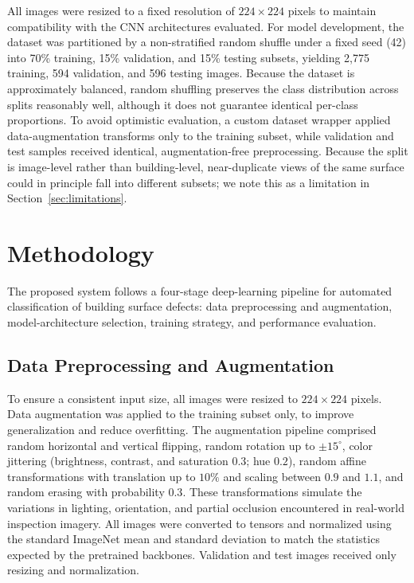 \documentclass[ASNA, twocolumn]{USG}
\begin{document}
All images were resized to a fixed resolution of $224\times224$ pixels to maintain compatibility with the CNN architectures evaluated. For model development, the dataset was partitioned by a non-stratified random shuffle under a fixed seed (42) into 70\% training, 15\% validation, and 15\% testing subsets, yielding 2{,}775 training, 594 validation, and 596 testing images. Because the dataset is approximately balanced, random shuffling preserves the class distribution across splits reasonably well, although it does not guarantee identical per-class proportions. To avoid optimistic evaluation, a custom dataset wrapper applied data-augmentation transforms only to the training subset, while validation and test samples received identical, augmentation-free preprocessing. Because the split is image-level rather than building-level, near-duplicate views of the same surface could in principle fall into different subsets; we note this as a limitation in Section~\ref{sec:limitations}.

\section{Methodology}

The proposed system follows a four-stage deep-learning pipeline for automated classification of building surface defects: data preprocessing and augmentation, model-architecture selection, training strategy, and performance evaluation.

\subsection{Data Preprocessing and Augmentation}
To ensure a consistent input size, all images were resized to $224\times224$ pixels. Data augmentation was applied to the training subset only, to improve generalization and reduce overfitting. The augmentation pipeline comprised random horizontal and vertical flipping, random rotation up to $\pm15^{\circ}$, color jittering (brightness, contrast, and saturation $0.3$; hue $0.2$), random affine transformations with translation up to $10\%$ and scaling between $0.9$ and $1.1$, and random erasing with probability $0.3$. These transformations simulate the variations in lighting, orientation, and partial occlusion encountered in real-world inspection imagery. All images were converted to tensors and normalized using the standard ImageNet mean and standard deviation to match the statistics expected by the pretrained backbones. Validation and test images received only resizing and normalization.
\end{document}
